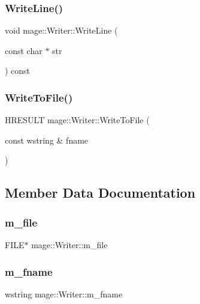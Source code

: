 \hypertarget{classmage_1_1_writer_ab6f3d56fd4ff285af3a4bb292dba8271}{}\label{classmage_1_1_writer_ab6f3d56fd4ff285af3a4bb292dba8271} 
\subsubsection{\texorpdfstring{Write\+Line()}{WriteLine()}}
{\footnotesize\ttfamily void mage\+::\+Writer\+::\+Write\+Line (\begin{DoxyParamCaption}\item[{const char $\ast$}]{str }\end{DoxyParamCaption}) const\hspace{0.3cm}{\ttfamily [protected]}}

\hypertarget{classmage_1_1_writer_ae9250f340229ee80dc5c518045567f7d}{}\label{classmage_1_1_writer_ae9250f340229ee80dc5c518045567f7d} 
\subsubsection{\texorpdfstring{Write\+To\+File()}{WriteToFile()}}
{\footnotesize\ttfamily H\+R\+E\+S\+U\+LT mage\+::\+Writer\+::\+Write\+To\+File (\begin{DoxyParamCaption}\item[{const wstring \&}]{fname }\end{DoxyParamCaption})}



\subsection{Member Data Documentation}
\hypertarget{classmage_1_1_writer_a04428b72245b50d45c62cbd23c2f039a}{}\label{classmage_1_1_writer_a04428b72245b50d45c62cbd23c2f039a} 
\subsubsection{\texorpdfstring{m\+\_\+file}{m\_file}}
{\footnotesize\ttfamily F\+I\+LE$\ast$ mage\+::\+Writer\+::m\+\_\+file\hspace{0.3cm}{\ttfamily [private]}}

\hypertarget{classmage_1_1_writer_afa271ee47897d4961e9d62132d8faeb5}{}\label{classmage_1_1_writer_afa271ee47897d4961e9d62132d8faeb5} 
\subsubsection{\texorpdfstring{m\+\_\+fname}{m\_fname}}
{\footnotesize\ttfamily wstring mage\+::\+Writer\+::m\+\_\+fname\hspace{0.3cm}{\ttfamily [private]}}

